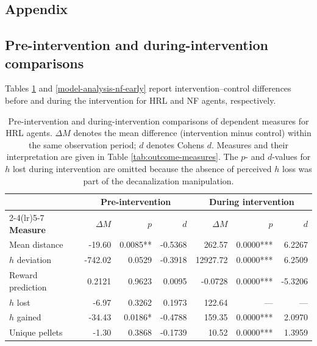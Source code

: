 \documentclass[12pt,fleqn]{article}
\begin{document}
\clearpage
\begin{appendices}

  \section{Appendix}\label{appendix}

  

  \subsection{Pre-intervention and during-intervention comparisons}\label{app:early-comparisons}

  Tables \ref{model-analysis-hrl-early} and \ref{model-analysis-nf-early} report intervention--control differences before and during the intervention for HRL and NF agents, respectively. 

\begin{table}[H]
  \centering
  \small
  \setlength{\tabcolsep}{2pt}
  \begin{tabular}{@{}lrrrrrr@{}}
    \toprule
     & \multicolumn{3}{c}{\textbf{Pre-intervention}} & \multicolumn{3}{c}{\textbf{During intervention}} \\
    \cmidrule(lr){2-4}\cmidrule(lr){5-7}
\textbf{Measure} & \textbf{\(\Delta M\)} & \textbf{\(p\)} & \textbf{\(d\)} & \textbf{\(\Delta M\)} & \textbf{\(p\)} & \textbf{\(d\)} \\
    \midrule
    Mean distance & -19.60 & 0.0085** & -0.5368 & 262.57 & 0.0000*** & 6.2267 \\
    \(h\) deviation & -742.02 & 0.0529 & -0.3918 & 12927.72 & 0.0000*** & 6.2509 \\
    Reward prediction & 0.2121 & 0.9623 & 0.0095 & -0.0728 & 0.0000*** & -5.3206 \\
    \(h\) lost & -6.97 & 0.3262 & 0.1973 & 122.64 & --- & --- \\
    \(h\) gained & -34.43 & 0.0186* & -0.4788 & 159.35 & 0.0000*** & 2.0970 \\
    Unique pellets & -1.30 & 0.3868 & -0.1739 & 10.52 & 0.0000*** & 1.3959 \\
    \bottomrule
  \end{tabular}
  \caption{Pre-intervention and during-intervention comparisons of dependent measures for HRL agents. \(\Delta M\) denotes the mean difference (intervention minus control) within the same observation period; \(d\) denotes Cohen\textquotesingle s \(d\). Measures and their interpretation are given in Table \ref{tab:outcome-measures}. The \(p\)- and \(d\)-values for \(h\) lost during intervention are omitted because the absence of perceived \(h\) loss was part of the decanalization manipulation.}
  \label{model-analysis-hrl-early}
\end{table}


\end{appendices}
\end{document}
